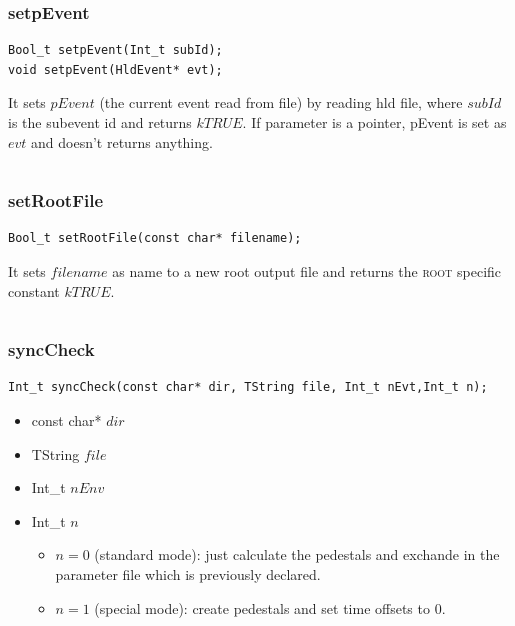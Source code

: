 \documentclass[a4paper]{book}
\begin{document}
\[\]

\subsubsection{setpEvent}

\begin{lstlisting}[style=customc]
Bool_t setpEvent(Int_t subId);
void setpEvent(HldEvent* evt);
\end{lstlisting}

It sets $pEvent$ (the current event read from file) by reading hld file, where $subId$ is the subevent id and returns $kTRUE$. If parameter is a pointer, pEvent is set as $evt$ and doesn't returns anything.

\[\]

\subsubsection{setRootFile}

\begin{lstlisting}[style=customc]
Bool_t setRootFile(const char* filename);
\end{lstlisting}

It sets $filename$ as name to a new root output file and returns the \textsc{root} specific constant $kTRUE$.

\[\]


\subsubsection{syncCheck}

\begin{lstlisting}[style=customc]
Int_t syncCheck(const char* dir, TString file, Int_t nEvt,Int_t n);
\end{lstlisting}

\begin{itemize}
	\item const char* $dir$
	\item TString $file$
	\item Int\_t $nEnv$
	\item Int\_t $n$
	\begin{itemize}
		\item $n = 0$ (standard mode): just calculate the pedestals and exchande in the parameter file which is previously declared.
		\item $n = 1$ (special mode):  create pedestals and set time offsets to 0.
	\end{itemize}
	
\end{itemize}
\end{document}

